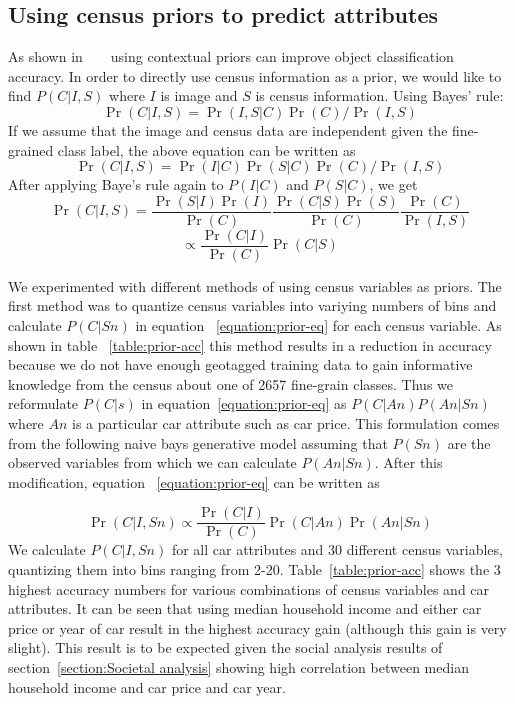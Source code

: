 \documentclass[10pt,twocolumn,letterpaper]{article}
\begin{document}
\subsection{Using census priors to predict attributes}
As shown in ~\cite{birdsnap} ~\cite{Other context stuff} using contextual priors can improve object classification accuracy. In order to directly use census information as a prior, we would like to find \(P(C|I,S)\) where \(I\) is image and \(S\) is census information. Using Bayes' rule: 
\begin{equation}
\Pr(C|I,S)=\Pr(I,S|C)\Pr(C)/\Pr(I,S)
\end{equation}
If we assume that the image and census data are independent given the fine-grained class label, the above equation can be written as 
\begin{equation}
\Pr(C|I,S)=\Pr(I|C)\Pr(S|C)\Pr(C)/\Pr(I,S)
\end{equation}
After applying Baye's rule again to \(P(I|C)\) and \(P(S|C)\), we get
\begin{equation}
\Pr(C|I,S)=\frac{\Pr(S|I)\Pr(I)}{\Pr(C)}\frac{\Pr(C|S)\Pr(S)}{\Pr(C)} \frac{\Pr(C)}{\Pr(I,S)}
\end{equation}
\begin{equation}
\propto \frac{\Pr(C|I)}{\Pr(C)}\Pr(C|S)
\label{eq:prior-eq}
\end{equation}

We experimented with different methods of using census variables as priors. The first method was to quantize census variables into variying numbers of bins and calculate \(P(C|Sn)\) in equation ~\ref{equation:prior-eq} for each census variable.
As shown in table ~\ref{table:prior-acc} this method results in a reduction in accuracy because we do not have enough geotagged training data to gain informative knowledge from the census about one of 2657 fine-grain classes. Thus we reformulate \(P(C|s)\) in equation~\ref{equation:prior-eq} as \(P(C|An)\)\(P(An|Sn)\) where \(An\) is a particular car attribute such as car price. This formulation comes from the following naive bays generative model assuming that \(P(Sn)\) are the observed variables from which we can calculate \(P(An|Sn)\). After this modification, equation ~\ref{equation:prior-eq} can be written as 

\begin{equation}
  \Pr(C|I,Sn) \propto \frac{\Pr(C|I)}{\Pr(C)}\Pr(C|An)\Pr(An|Sn)
\end{equation}
We calculate \(P(C|I,Sn)\) for all car attributes and 30 different census variables, quantizing them into bins ranging from 2-20. Table~\ref{table:prior-acc} shows the 3 highest accuracy numbers for various combinations of census variables and car attributes. It can be seen that using median household income and either car price or year of car result in the highest accuracy gain (although this gain is very slight). This result is to be expected given the social analysis results of section~\ref{section:Societal analysis} showing high correlation between median household income and car price and car year.
\end{document}
